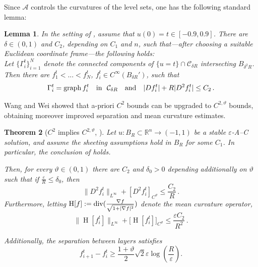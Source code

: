 \documentclass{article}
\newcommand{\R}{\mathbb{R}}
\newcommand{\ep}{\varepsilon}
\newcommand{\HH}{\operatorname{H}}
\newtheorem{theorem}{Theorem}[section]
\newtheorem{lemma}[theorem]{Lemma}
\theoremstyle{definition}
\begin{document}
Since $\mathcal A$ controls the curvatures of the level sets, one has the following standard lemma:
\begin{lemma}\label{lem:rjbagbda}
    In the setting of , assume that $u(0)= t\in [-0.9,0.9]$. There are $\delta\in(0,1)$ and $C_2$, depending on $C_1$ and $n$, such that---after choosing a suitable Euclidean coordinate frame---the following holds:\\
    Let $\{\Gamma^t_i\}_{i=1}^N$ denote the connected components of $\{u=t\}\cap  \mathcal C_{\delta R}$ intersecting $B_{\delta^2 R}$. Then there are $f^t_1<...< f^t_N$, $f^t_i\in C^\infty(B_{\delta R}')$, such that
    \begin{equation*}
        \Gamma_i^t={\rm graph} \,f_i^t\quad \mbox{in }\ \mathcal C_{\delta R}\quad\mbox{and}\quad |D f_i^t|+R|D^2 f_i^t|\leq C_2\,.
    \end{equation*}
\end{lemma}
Wang and Wei showed that a-priori $C^2$ bounds can be upgraded to $C^{2,\vartheta}$ bounds, obtaining moreover improved separation and mean curvature estimates.
\begin{theorem}[$C^2$ implies $C^{2,\vartheta}$, \cite{WW19}]\label{thm:sheetimpc2alpha}
    Let $u:B_R\subset \R^n\to (-1,1)$ be a stable $\ep$-A--C solution, and assume the sheeting assumptions hold in $B_R$ for some $C_1$. In particular, the conclusion of  holds.
    
     Then, for every $\vartheta\in(0,1)$ there are $C_2$ and $\delta_0>0$ depending additionally on $\vartheta$ such that if $\frac{\ep}{R}\leq \delta_0$, then
    \begin{equation}\label{eq:c2alphasheet}
        \|D^2 f_i^t\|_{L^\infty}+[D^2 f_i^t]_{C^\vartheta}\leq \frac{C_2}{R}\,.
    \end{equation}
    Furthermore, letting $\HH[f]:={\rm div}(\frac{\nabla f}{\sqrt{1+|\nabla f|^2}})$ denote the mean curvature operator,
    \begin{equation}\label{eq:meancurvsheet}
         \|\HH[f_i^t]\|_{L^\infty}+ \big[\HH[ f_i^t]\big]_{C^\vartheta}\leq \frac{\ep C_2}{R^2}\,.
    \end{equation}
    
    
    Additionally, the separation between layers satisfies
    \begin{equation}\label{eq:wwsepbnd}
        f_{i+1}^t-f_i^t\geq \frac{1+\vartheta}{2}\sqrt{2}\ep\log{\left(\frac{R}{\ep}\right)}.
    \end{equation}
\end{theorem}
\end{document}

